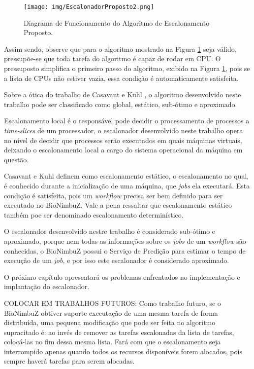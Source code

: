 \begin{figure}[htbp]
	\centerline{\texttt{[image: img/EscalonadorProposto2.png]}}
	\caption{Diagrama de Funcionamento do Algoritmo de Escalonamento Proposto.}
	\label{Escalonamento}
\end{figure}


Assim sendo, observe que para o algoritmo mostrado na Figura \ref{Escalonamento} seja válido, pressupõe-se que toda tarefa do algoritmo é capaz de rodar em \acrshort{CPU}. O pressuposto simplifica o primeiro passo do algoritmo, exibido na Figura \ref{Escalonamento}, pois se a lista de \acrshort{CPU}s não estiver vazia, essa condição é automaticamente satisfeita.

Sobre a ótica do trabalho de Casavant e Kuhl \cite{4634_TaxonomiaEscalonador}, o algoritmo desenvolvido neste trabalho pode ser classificado como global, estático, sub-ótimo e aproximado.%

Escalonamento local é o responsável pode decidir o processamento de processos a \textit{time-slices} de um processador, o escalonador desenvolvido neste trabalho opera no nível de decidir que processos serão executados em quais máquinas virtuais, deixando o escalonamento local a cargo do sistema operacional da máquina em questão.

Casavant e Kuhl \cite{4634_TaxonomiaEscalonador} definem como escalonamento estático, o escalonamento no qual, é conhecido durante a inicialização de uma máquina, que \textit{jobs} ela executará. Esta condição é satisfeita, pois um \textit{workflow} precisa ser bem definido para ser executado no BioNimbuZ. Vale a pena ressaltar que escalonamento estático também poe ser denominado escalonamento determinístico.

O escalonador desenvolvido nestre trabalho é considerado sub-ótimo e aproximado, porque nem todas as informações sobre os \textit{jobs} de um \textit{workflow} são conhecidas, o BioNimbuZ possui o Serviço de Predição para estimar o tempo de execução de um \textit{job}, e por isso este escalonador é considerado aproximado.


O próximo capítulo apresentará os problemas enfrentados no implementação e implantação do escalonador.

COLOCAR EM TRABALHOS FUTUROS: Como trabalho futuro, se o BioNimbuZ obtiver suporte executação de uma mesma tarefa de forma distribuída, uma pequena modificação que pode ser feita no algoritmo supracitado é: ao invés de remover as tarefas escalonadas da lista de tarefas, colocá-las no fim dessa mesma lista. Fará com que o escalonamento seja interrompido apenas quando todos os recursos disponíveis forem alocados, pois sempre haverá tarefas para serem alocadas.


